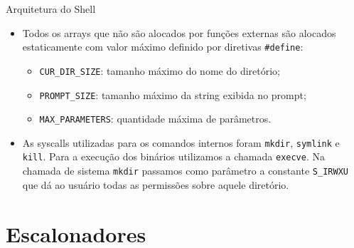 \documentclass[10pt]{beamer}
\begin{document}
    \begin{frame}{Arquitetura do Shell}
      \begin{itemize}
        \justifying
        \item Todos os arrays que não são alocados por funções externas são alocados estaticamente com valor máximo definido por diretivas \texttt{\#define}:
        \begin{itemize}
          \vspace{-0.25in}
          \item \texttt{CUR\_DIR\_SIZE}: tamanho máximo do nome do diretório;
          \item \texttt{PROMPT\_SIZE}: tamanho máximo da string exibida no prompt;
          \item \texttt{MAX\_PARAMETERS}: quantidade máxima de parâmetros.
        \end{itemize}
        \item As syscalls utilizadas para os comandos internos foram \texttt{mkdir}, \texttt{symlink} e \texttt{kill}. Para a execução dos binários utilizamos a chamada \texttt{execve}.
        Na chamada de sistema \texttt{mkdir} passamos como parâmetro a
        constante \texttt{S\_IRWXU} que dá ao usuário todas as permissões
        sobre aquele diretório.
      \end{itemize}
    \end{frame}
    \section{Escalonadores}
\end{document}
